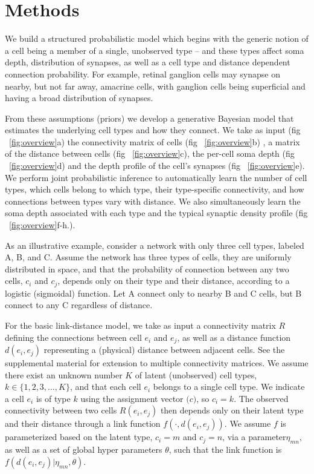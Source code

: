 \documentclass{article}
\renewcommand{\vec}[1]{\mathbf{#1}}
\begin{document}
\section*{Methods}


We build a structured probabilistic model which begins with the
generic notion of a cell being a member of a single, unobserved type
-- and these types affect soma depth, distribution of synapses, as
well as a cell type and distance dependent connection probability. For
example, retinal ganglion cells may synapse on nearby, but not far
away, amacrine cells, with ganglion cells being superficial and having
a broad distribution of synapses.  


From these assumptions (priors) we develop a generative Bayesian model
that estimates the underlying cell types and how they connect. We take
as input (fig ~\ref{fig:overview}a) the connectivity matrix of cells
(fig ~\ref{fig:overview}b) , a matrix of the distance between cells
(fig ~\ref{fig:overview}c), the per-cell soma depth (fig
~\ref{fig:overview}d) and the depth profile of the cell's synapses
(fig ~\ref{fig:overview}e). We perform joint probabilistic inference
to automatically learn the number of cell types, which cells belong to
which type, their type-specific connectivity, and how connections
between types vary with distance. We also simultaneously learn the
soma depth associated with each type and the typical synaptic density
profile (fig ~\ref{fig:overview}f-h.).


As an illustrative example, consider a network with only three cell
types, labeled A, B, and C. Assume the network has three types of
cells, they are uniformly distributed in space, and that the
probability of connection between any two cells, $c_i$ and $c_j$,
depends only on their type and their distance, according to a logistic
(sigmoidal) function. Let A connect only to nearby B and C cells, but B
connect to any C regardless of distance. 


For the basic link-distance model, we take as input a connectivity
matrix $R$ defining the connections between cell $e_i$ and $e_j$, as
well as a distance function $d(e_i, e_j)$ representing a (physical)
distance between adjacent cells.  See
the supplemental material for extension to multiple connectivity
matrices. We assume there exist an unknown number $K$ of latent
(unobserved) cell types, $k \in \{1, 2, 3, \dots, K\}$, and that each
cell $e_i$ belongs to a single cell type. We indicate a cell $e_i$ is
of type $k$ using the assignment vector $\vec(c)$, so $c_i = k$. The
observed connectivity between two cells $R(e_i, e_j)$ then depends
only on their latent type and their distance through a link function
$f(\cdot, d(e_i, e_j))$. We assume $f$ is parameterized based on the
latent type, $c_i=m$ and $c_j=n$, via a parameter$\eta_{mn}$, as well
as a set of global hyper parameters $\theta$, such that the link
function is $f(d(e_i, e_j) | \eta_{mn}, \theta)$.
\end{document}
